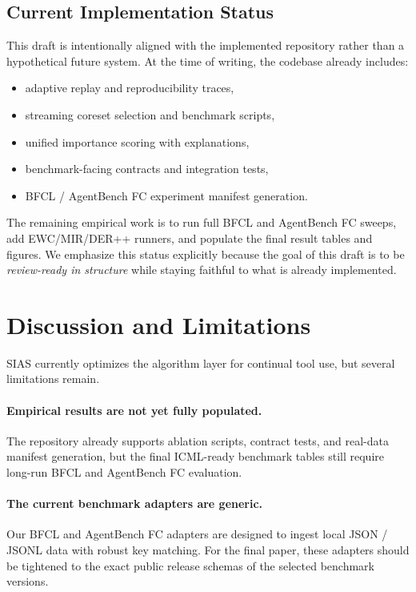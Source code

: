 \documentclass{article}
\begin{document}
\subsection{Current Implementation Status}

This draft is intentionally aligned with the implemented repository rather than a hypothetical future system. At the time of writing, the codebase already includes:
\begin{itemize}[leftmargin=12pt]
    \item adaptive replay and reproducibility traces,
    \item streaming coreset selection and benchmark scripts,
    \item unified importance scoring with explanations,
    \item benchmark-facing contracts and integration tests,
    \item BFCL / AgentBench FC experiment manifest generation.
\end{itemize}

The remaining empirical work is to run full BFCL and AgentBench FC sweeps, add EWC/MIR/DER++ runners, and populate the final result tables and figures. We emphasize this status explicitly because the goal of this draft is to be \emph{review-ready in structure} while staying faithful to what is already implemented.

\section{Discussion and Limitations}

SIAS currently optimizes the algorithm layer for continual tool use, but several limitations remain.

\paragraph{Empirical results are not yet fully populated.}
The repository already supports ablation scripts, contract tests, and real-data manifest generation, but the final ICML-ready benchmark tables still require long-run BFCL and AgentBench FC evaluation.

\paragraph{The current benchmark adapters are generic.}
Our BFCL and AgentBench FC adapters are designed to ingest local JSON / JSONL data with robust key matching. For the final paper, these adapters should be tightened to the exact public release schemas of the selected benchmark versions.
\end{document}
